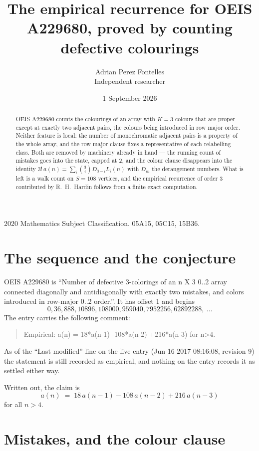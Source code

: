 \documentclass[11pt,a4paper]{article}
\title{The empirical recurrence for OEIS A229680, proved by counting defective colourings}
\author{Adrian Perez Fontelles\\ \small Independent researcher}
\date{1 September 2026}
\theoremstyle{plain}
\theoremstyle{definition}
\begin{document}
\maketitle

\begin{abstract}
OEIS A229680 counts the colourings of an array with $K=3$ colours that are proper except at
exactly two adjacent pairs, the colours being introduced in row
major order. Neither feature is local: the number of monochromatic adjacent pairs is a
property of the whole array, and the row major clause fixes a representative of each
relabelling class. Both are removed by machinery already in hand --- the running count of
mistakes goes into the state, capped at $2$, and the colour clause disappears into the
identity $3!\,a(n)=\sum_i\binom{3}{i}D_{3-i}L_i(n)$ with $D_m$ the derangement
numbers. What is left is a walk count on $S=108$ vertices, and the empirical recurrence of
order $3$ contributed by R.~H.~Hardin follows from a finite exact computation.
\end{abstract}

\noindent\small 2020 Mathematics Subject Classification. 05A15, 05C15, 15B36.\normalsize

\section{The sequence and the conjecture}

OEIS A229680 is ``Number of defective 3-colorings of an n X 3 0..2 array connected diagonally and antidiagonally with exactly two mistakes, and colors introduced in row-major 0..2 order.''. It has offset $1$ and begins
\[
0, 36, 888, 10896, 108000, 959040, 7952256, 62892288,\ \dots
\]
The entry carries the following comment:
\begin{quote}\small
Empirical: a(n) = 18*a(n-1) -108*a(n-2) +216*a(n-3) for n>4.
\end{quote}
As of the ``Last modified'' line on the live entry (Jun 16 2017 08:16:08, revision 9) the statement is
still recorded as empirical, and nothing on the entry records it as settled either way.

Written out, the claim is
\begin{equation}\label{eq:conj}
a(n)\;=\;18\,a(n-1) - 108\,a(n-2) + 216\,a(n-3)
\end{equation}
for all $n>4$.

\section{Mistakes, and the colour clause}
\end{document}
